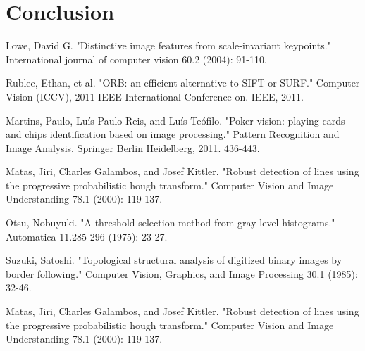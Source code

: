 \documentclass[journal,twoside]{IEEEtran}
\begin{document}
\section{Conclusion}




\begin{thebibliography}{9}

Lowe, David G. "Distinctive image features from scale-invariant keypoints." International journal of computer vision 60.2 (2004): 91-110.

Rublee, Ethan, et al. "ORB: an efficient alternative to SIFT or SURF." Computer Vision (ICCV), 2011 IEEE International Conference on. IEEE, 2011.

Martins, Paulo, Luís Paulo Reis, and Luís Teófilo. "Poker vision: playing cards and chips identification based on image processing." Pattern Recognition and Image Analysis. Springer Berlin Heidelberg, 2011. 436-443.

Matas, Jiri, Charles Galambos, and Josef Kittler. "Robust detection of lines using the progressive probabilistic hough transform." Computer Vision and Image Understanding 78.1 (2000): 119-137.

Otsu, Nobuyuki. "A threshold selection method from gray-level histograms." Automatica 11.285-296 (1975): 23-27.

Suzuki, Satoshi. "Topological structural analysis of digitized binary images by border following." Computer Vision, Graphics, and Image Processing 30.1 (1985): 32-46.

Matas, Jiri, Charles Galambos, and Josef Kittler. "Robust detection of lines using the progressive probabilistic hough transform." Computer Vision and Image Understanding 78.1 (2000): 119-137.




\end{thebibliography}
\end{document}
